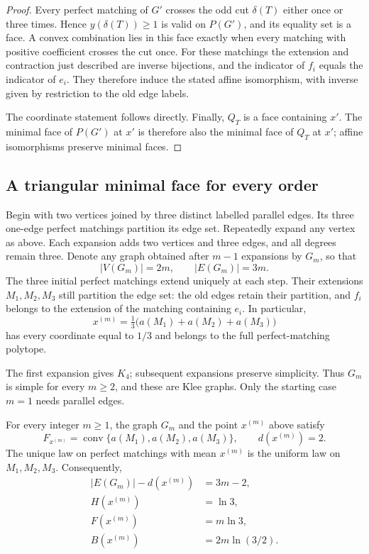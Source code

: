 \begin{proof}
Every perfect matching of \(G'\) crosses the odd cut
\(\delta(T)\) either once or three times. Hence
\(y(\delta(T))\ge1\) is valid on \(P(G')\), and its equality set
is a face. A convex combination lies in this face exactly when
every matching with positive coefficient crosses the cut once.
For these matchings the extension and contraction just described
are inverse bijections, and the indicator of \(f_i\) equals the
indicator of \(e_i\). They therefore induce the stated affine
isomorphism, with inverse given by restriction to the old edge
labels.

The coordinate statement follows directly. Finally, \(Q_T\) is
a face containing \(x'\). The minimal face of \(P(G')\) at
\(x'\) is therefore also the minimal face of \(Q_T\) at \(x'\);
affine isomorphisms preserve minimal faces.
\end{proof}

\subsection{A triangular minimal face for every order}

Begin with two vertices joined by three distinct labelled parallel
edges. Its three one-edge perfect matchings partition its edge set.
Repeatedly expand any vertex as above. Each expansion adds two
vertices and three edges, and all degrees remain three. Denote
any graph obtained after \(m-1\) expansions by \(G_m\), so that
\[
 |V(G_m)|=2m,\qquad |E(G_m)|=3m.
\]
The three initial perfect matchings extend uniquely at each step.
Their extensions \(M_1,M_2,M_3\) still partition the edge set:
the old edges retain their partition, and \(f_i\) belongs to the
extension of the matching containing \(e_i\). In particular,
\[
 x^{(m)}=\tfrac13\bigl(a(M_1)+a(M_2)+a(M_3)\bigr)
\]
has every coordinate equal to \(1/3\) and belongs to the full
perfect-matching polytope.

The first expansion gives \(K_4\); subsequent expansions preserve
simplicity. Thus \(G_m\) is simple for every \(m\ge2\), and these
are Klee graphs. Only the starting case \(m=1\) needs parallel
edges.

\begin{proposition}
\label{ex:prop-klee-face}
For every integer \(m\ge1\), the graph \(G_m\) and the point
\(x^{(m)}\) above satisfy
\[
 F_{x^{(m)}}=
 \operatorname{conv}\{a(M_1),a(M_2),a(M_3)\},
 \qquad d(x^{(m)})=2.
\]
The unique law on perfect matchings with mean \(x^{(m)}\) is the
uniform law on \(M_1,M_2,M_3\). Consequently,
\begin{equation}
\label{ex:eq-klee-values}
 \begin{aligned}
 |E(G_m)|-d(x^{(m)})&=3m-2,\\
 H(x^{(m)})&=\ln3,\\
 F(x^{(m)})&=m\ln3,\\
 B(x^{(m)})&=2m\ln(3/2).
 \end{aligned}
\end{equation}
\end{proposition}

